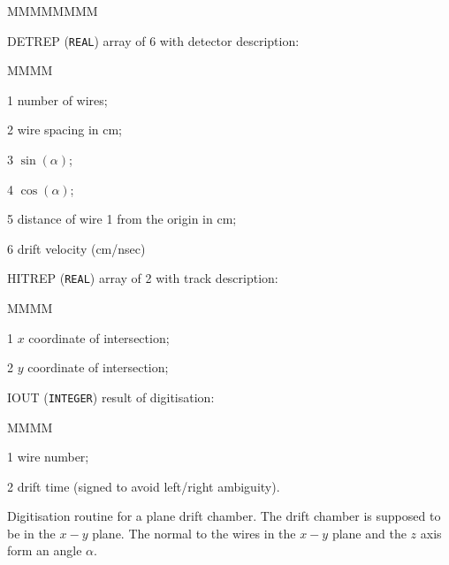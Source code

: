    

\begin{DLtt}{MMMMMMMM}
\item[DETREP] ({\tt REAL}) array of 6 with detector description:
\begin{DLtt}{MMMM}
\item[1] number of wires;
\item[2] wire spacing in cm;
\item[3] $\sin(\alpha)$;
\item[4] $\cos(\alpha)$;
\item[5] distance of wire 1 from the origin in cm;
\item[6] drift velocity (cm/nsec)
\end{DLtt}
\item[HITREP] ({\tt REAL}) array of 2 with track description:
\begin{DLtt}{MMMM}
\item[1] $x$ coordinate of intersection;
\item[2] $y$ coordinate of intersection;
\end{DLtt}
\item[IOUT] ({\tt INTEGER}) result of digitisation:
\begin{DLtt}{MMMM}
\item[1] wire number;
\item[2] drift time (signed to avoid left/right ambiguity).
\end{DLtt}
\end{DLtt}
Digitisation routine for a plane drift chamber. The drift chamber is supposed
to be in the $x-y$ plane. The normal to the wires in the $x-y$ plane and the
$z$ axis form an angle $\alpha$.

